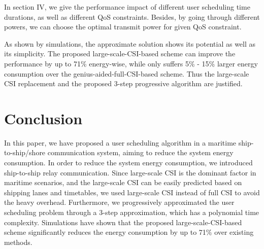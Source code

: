 \documentclass[journal]{IEEEtran}
\begin{document}

 In section IV, we give the performance impact of different user scheduling time durations, as well as different QoS constraints. 
 Besides, by going through different powers, we can choose the optimal transmit power for given QoS constraint. 
 
 
 As shown by simulations, the approximate solution shows its potential as well as its simplicity. The proposed large-scale-CSI-based scheme can improve the performance by up to 71\% energy-wise, while only suffers 5\% - 15\% larger energy consumption over the genius-aided-full-CSI-based scheme. Thus the large-scale CSI replacement and the proposed 3-step progressive algorithm are justified. 

 
 \section{Conclusion}\label{sec:5}
 
 In this paper, we have proposed a user scheduling algorithm in a maritime ship-to-ship/shore communication system, aiming to reduce the system energy consumption. 
 In order to reduce the system energy consumption, we introduced ship-to-ship relay communication. 
 Since large-scale CSI is the dominant factor in maritime scenarios, and the large-scale CSI can be easily predicted based on shipping lanes and timetables, we used large-scale CSI instead of full CSI to avoid the heavy overhead. Furthermore, we progressively approximated the user scheduling problem through a 3-step approximation, which has a polynomial time complexity. Simulations have shown that the proposed large-scale-CSI-based scheme significantly reduces the energy consumption by up to 71\% over existing methods.
\end{document}
